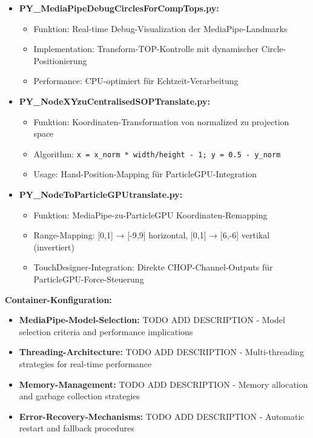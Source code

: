 \begin{itemize}
    \item \textbf{PY\_MediaPipeDebugCirclesForCompTops.py:}
    \begin{itemize}
        \item Funktion: Real-time Debug-Visualization der MediaPipe-Landmarks
        \item Implementation: Transform-TOP-Kontrolle mit dynamischer Circle-Positionierung
        \item Performance: CPU-optimiert für Echtzeit-Verarbeitung
    \end{itemize}
    
    \item \textbf{PY\_NodeXYzuCentralisedSOPTranslate.py:}
    \begin{itemize}
        \item Funktion: Koordinaten-Transformation von normalized zu projection space
        \item Algorithm: \texttt{x = x\_norm * width/height - 1; y = 0.5 - y\_norm}
        \item Usage: Hand-Position-Mapping für ParticleGPU-Integration
    \end{itemize}
    
    \item \textbf{PY\_NodeToParticleGPUtranslate.py:}
    \begin{itemize}
        \item Funktion: MediaPipe-zu-ParticleGPU Koordinaten-Remapping
        \item Range-Mapping: [0,1] → [-9,9] horizontal, [0,1] → [6,-6] vertikal (invertiert)
        \item TouchDesigner-Integration: Direkte CHOP-Channel-Outputs für ParticleGPU-Force-Steuerung
    \end{itemize}
\end{itemize}

\textbf{Container-Konfiguration:}
\begin{itemize}
    \item \textbf{MediaPipe-Model-Selection:} TODO ADD DESCRIPTION - Model selection criteria and performance implications
    \item \textbf{Threading-Architecture:} TODO ADD DESCRIPTION - Multi-threading strategies for real-time performance
    \item \textbf{Memory-Management:} TODO ADD DESCRIPTION - Memory allocation and garbage collection strategies
    \item \textbf{Error-Recovery-Mechanisms:} TODO ADD DESCRIPTION - Automatic restart and fallback procedures
\end{itemize}

